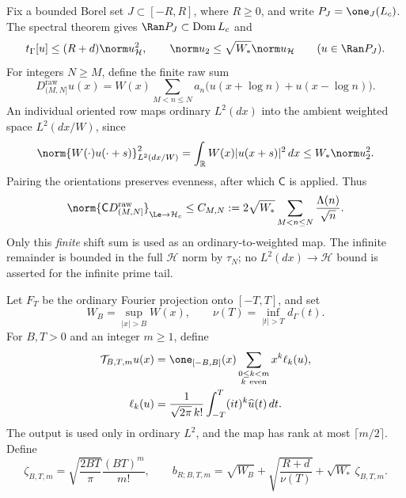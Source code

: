 \documentclass[11pt,a4paper]{article}
\numberwithin{equation}{section}
\theoremstyle{definition}\newtheorem{definition}[theorem]{Definition}
\theoremstyle{remark}\newtheorem{remark}[theorem]{Remark}
\newcommand{\R}{\mathbb R}\newcommand{\C}{\mathbb C}\newcommand{\N}{\mathbb N}
\newcommand{\Hh}{\mathcal H}\newcommand{\Hw}{\mathcal H}
\newcommand{\tg}{t_\Gamma}\newcommand{\cg}{c_\Gamma}
\newcommand{\dom}{\operatorname{Dom}}\newcommand{\Var}{\operatorname{Var}}
\begin{document}
Fix a bounded Borel set $J\subset[-R,R]$, where $R\ge0$, and write
$P_J=\one_J(L_c)$. The spectral theorem gives
$\Ran P_J\subset\dom L_c$ and
\begin{equation}\label{vfourB:window-energy}
 \tg[u]\le(R+d)\norm u_{\Hh}^2,
 \qquad \norm u_2\le\sqrt{W_*}\norm u_{\Hh}
 \qquad(u\in\Ran P_J).
\end{equation}
For integers $N\ge M$, define the finite raw sum
\[
 D_{(M,N]}^{\mathrm{raw}}u(x)
 =W(x)\sum_{M<n\le N}a_n
       \bigl(u(x+\log n)+u(x-\log n)\bigr).
\]
An individual oriented row maps ordinary $L^2(dx)$ into the ambient
weighted space $L^2(dx/W)$, since
\[
 \norm{W(\cdot)u(\cdot+s)}_{L^2(dx/W)}^2
 =\int_{\R}W(x)|u(x+s)|^2\,dx\le W_*\norm u_2^2.
\]
Pairing the orientations preserves evenness, after which $\mathsf C$ is
applied. Thus
\begin{equation}\label{vfourB:finite-shift-cap}
 \norm{\mathsf C D_{(M,N]}^{\mathrm{raw}}}
       _{\Le\to\Hh_c}
 \le C_{M,N}:=2\sqrt{W_*}\sum_{M<n\le N}\frac{\Lambda(n)}{\sqrt n}.
\end{equation}
Only this \emph{finite} shift sum is used as an ordinary-to-weighted map.
The infinite remainder is bounded in the full $\Hh$ norm by $\tau_N$;
no $L^2(dx)\to\Hh$ bound is asserted for the infinite prime tail.

Let $F_T$ be the ordinary Fourier projection onto $[-T,T]$, and set
\[
 W_B=\sup_{|x|>B}W(x),\qquad
 \nu(T)=\inf_{|t|>T}d_\Gamma(t).
\]
For $B,T>0$ and an integer $m\ge1$, define
\begin{equation}\label{vfourB:taylor-map}
 \begin{split}
 \mathcal T_{B,T,m}u(x)
 &=\one_{[-B,B]}(x)\sum_{\substack{0\le k<m\\k\ \mathrm{even}}}
       x^k\ell_k(u),\\
 \ell_k(u)&=\frac{1}{\sqrt{2\pi}\,k!}
            \int_{-T}^T(it)^k\widehat u(t)\,dt.
 \end{split}
\end{equation}
The output is used only in ordinary $L^2$, and the map has rank at most
$\lceil m/2\rceil$. Define
\begin{equation}\label{vfourB:error-parameters}
 \zeta_{B,T,m}=\sqrt{\frac{2BT}{\pi}}\frac{(BT)^m}{m!},\qquad
 b_{R;B,T,m}=\sqrt{W_B}
       +\sqrt{\frac{R+d}{\nu(T)}}+\sqrt{W_*}\,\zeta_{B,T,m}.
\end{equation}
\end{document}
